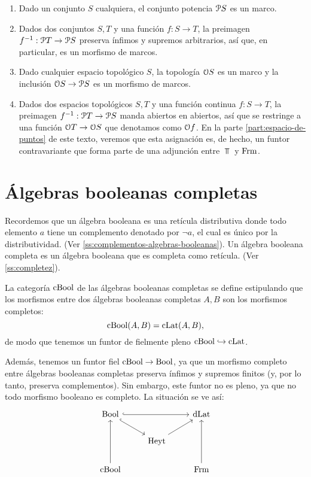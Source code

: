 \begin{example}
  \begin{enumerate}
    \item Dado un conjunto $S$ cualquiera, el conjunto potencia
    $\cal PS$ es un marco.
    \item Dados dos conjuntos $S,T$ y una función $f:S\to T$,
    la preimagen $f^{-1}:\cal PT\to\cal PS$ preserva ínfimos
    y supremos arbitrarios, así que, en particular, es un
    morfismo de marcos.
    \item Dado cualquier espacio topológico $S$, la topología
    $\cal OS$ es un marco y la inclusión $\cal OS\to\cal PS$
    es un morfismo de marcos.
    \item Dados dos espacios topológicos $S,T$ y una función
    continua $f:S\to T$, la preimagen $f^{-1}:\cal PT\to\cal
    PS$ manda abiertos en abiertos, así que se restringe a
    una función $\cal OT\to\cal OS$ que denotamos como $\cal
    Of$.
    En la parte \ref{part:espacio-de-puntos} de este texto,
    veremos que esta asignación es, de hecho, un funtor
    contravariante que forma parte de una
    adjunción entre $\Top$ y $\Frm$.
  \end{enumerate}
\end{example}

\section{Álgebras booleanas completas}\label{ABC}
Recordemos que un álgebra booleana es una retícula distributiva
donde todo elemento $a$ tiene un complemento denotado por $\neg a$, 
el cual es único por la distributividad. (Ver \ref{ss:complementos-algebras-booleanas}).
Un álgebra booleana completa es un álgebra booleana que es
completa como retícula. (Ver \ref{ss:completez}).


La categoría $\CBA$ de las álgebras booleanas completas se define
estipulando que los morfismos entre dos álgebras booleanas
completas $A,B$ son los morfismos completos:
\[
  \CBA(A,B)=\CLat(A,B)
,\]
de modo que tenemos un funtor de fielmente pleno
$\CBA\rmono\CLat$.

Además, tenemos un funtor fiel $\CBA\to\Bool$, ya que un morfismo
completo entre álgebras booleanas completas preserva ínfimos y
supremos finitos (y, por lo tanto, preserva complementos).
Sin embargo, este funtor no es pleno, ya que no todo morfismo booleano
es completo.
La situación se ve así:
\begin{equation}\label{diag:cuadrado-incompleto}
\begin{tikzcd}
  \Bool \ar[dr,hook] \ar[rr,hook] &               & \DLat \\
                                  & \Heyt \ar[ur]         \\
  \CBA \ar[uu] &           & \Frm \ar[uu]
\end{tikzcd}
\end{equation}

